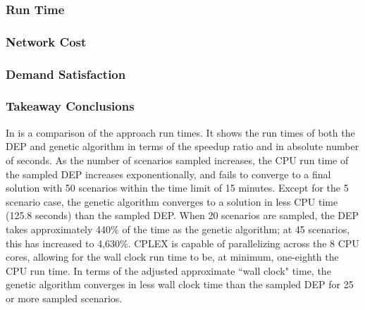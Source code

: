 \documentclass[12pt,dvipsnames]{report}
\begin{document}
\subsubsection{Run Time}

\subsubsection{Network Cost}

\subsubsection{Demand Satisfaction}

\subsubsection{Takeaway Conclusions}

\iffalse
In  is a comparison of the approach run times.  It shows the run times of both the DEP and genetic algorithm in terms of the speedup ratio and in absolute number of seconds.  As the number of scenarios sampled increases, the CPU run time of the sampled DEP increases exponentionally, and fails to converge to a final solution with 50 scenarios within the time limit of 15 minutes.  Except for the 5 scenario case, the genetic algorithm converges to a solution in less CPU time (125.8 seconds) than the sampled DEP.  When 20 scenarios are sampled, the DEP takes approximately 440\% of the time as the genetic algorithm; at 45 scenarios, this has increased to 4,630\%.  CPLEX is capable of parallelizing across the 8 CPU cores, allowing for the wall clock run time to be, at minimum, one-eighth the CPU run time.  In terms of the adjusted approximate ``wall clock" time, the genetic algorithm converges in less wall clock time than the sampled DEP for 25 or more sampled scenarios.
\end{document}
